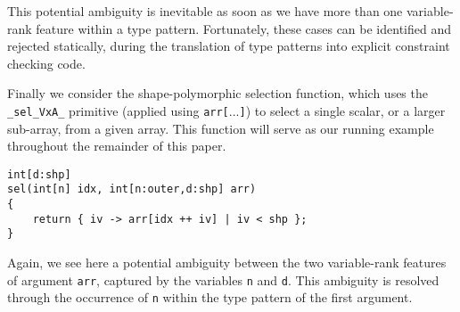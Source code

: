 This potential ambiguity is inevitable as soon as we have more than one variable-rank feature within a type pattern.
Fortunately, these cases can be identified and rejected statically, during the translation of type patterns into explicit constraint checking code.

Finally we consider the shape-polymorphic selection function, which uses the \verb|_sel_VxA_| primitive (applied using \texttt{arr[$...$]}) to select a single scalar, or a larger sub-array, from a given array.
This function will serve as our running example throughout the remainder of this paper.
\begin{lstlisting}
int[d:shp]
sel(int[n] idx, int[n:outer,d:shp] arr)
{
    return { iv -> arr[idx ++ iv] | iv < shp };
}
\end{lstlisting}

\noindent
Again, we see here a potential ambiguity between the two variable-rank features of argument \texttt{arr}, captured by the variables \texttt{n} and \texttt{d}.
This ambiguity is resolved through the occurrence of \texttt{n} within the type pattern of the first argument.
